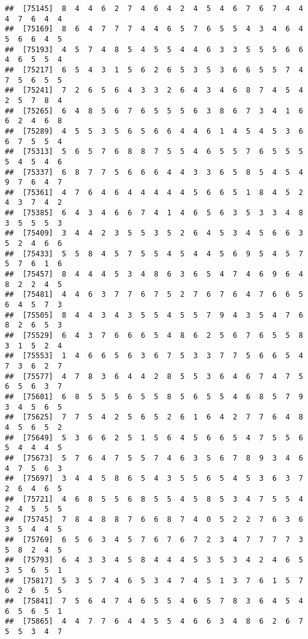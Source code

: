 \documentclass[
]{book}
\begin{document}
\begin{verbatim}
##  [75145]  8  4  4  6  2  7  4  6  4  2  4  5  4  6  7  6  7  4  4  4  7  6  4  4
##  [75169]  8  6  4  7  7  7  4  4  6  5  7  6  5  5  4  3  4  6  4  5  6  6  4  5
##  [75193]  4  5  7  4  8  5  4  5  5  4  4  6  3  3  5  5  5  6  6  4  6  5  5  4
##  [75217]  6  5  4  3  1  5  6  2  6  5  3  5  3  6  6  5  5  7  4  7  5  6  5  5
##  [75241]  7  2  6  5  6  4  3  3  2  6  4  3  4  6  8  7  4  5  4  2  5  7  8  4
##  [75265]  6  4  8  5  6  7  6  5  5  5  6  3  8  6  7  3  4  1  6  6  2  4  6  8
##  [75289]  4  5  5  3  5  6  5  6  6  4  4  6  1  4  5  4  5  3  6  6  7  5  5  4
##  [75313]  5  6  5  7  6  8  8  7  5  5  4  6  5  5  7  6  5  5  5  5  4  5  4  6
##  [75337]  6  8  7  7  5  6  6  6  4  4  3  3  6  5  8  5  4  5  4  9  7  6  4  7
##  [75361]  4  7  6  4  6  4  4  4  4  4  5  6  6  5  1  8  4  5  2  4  3  7  4  2
##  [75385]  6  4  3  4  6  6  7  4  1  4  6  5  6  3  5  3  3  4  8  3  5  5  5  3
##  [75409]  3  4  4  2  3  5  5  3  5  2  6  4  5  3  4  5  6  6  3  5  2  4  6  6
##  [75433]  5  5  8  4  5  7  5  5  4  5  4  4  5  6  9  5  4  5  7  5  7  6  1  6
##  [75457]  8  4  4  4  5  3  4  8  6  3  6  5  4  7  4  6  9  6  4  8  2  2  4  5
##  [75481]  4  4  6  3  7  7  6  7  5  2  7  6  7  6  4  7  6  6  5  6  4  5  7  3
##  [75505]  8  4  4  3  4  3  5  5  4  5  5  7  9  4  3  5  4  7  6  8  2  6  5  3
##  [75529]  6  4  3  7  6  6  6  5  4  8  6  2  5  6  7  6  5  5  8  3  1  5  2  4
##  [75553]  1  4  6  6  5  6  3  6  7  5  3  3  7  7  5  6  6  5  4  7  3  6  2  7
##  [75577]  4  7  8  3  6  4  4  2  8  5  5  3  6  4  6  7  4  7  5  6  5  6  3  7
##  [75601]  6  8  5  5  5  6  5  5  8  5  6  5  5  4  6  8  5  7  9  3  4  5  6  5
##  [75625]  7  7  5  4  2  5  6  5  2  6  1  6  4  2  7  7  6  4  8  4  5  6  5  2
##  [75649]  5  3  6  6  2  5  1  5  6  4  5  6  6  5  4  7  5  5  6  5  4  4  4  5
##  [75673]  5  7  6  4  7  5  5  7  4  6  3  5  6  7  8  9  3  4  6  4  7  5  6  3
##  [75697]  3  4  4  5  8  6  5  4  3  5  5  6  5  4  5  3  6  3  7  2  6  4  6  5
##  [75721]  4  6  8  5  5  6  8  5  5  4  5  8  5  3  4  7  5  5  4  2  4  5  5  5
##  [75745]  7  8  4  8  8  7  6  6  8  7  4  0  5  2  2  7  6  3  6  3  5  4  4  5
##  [75769]  6  5  6  3  4  5  7  6  7  6  7  2  3  4  7  7  7  7  3  5  8  2  4  5
##  [75793]  6  4  3  3  4  5  8  4  4  4  5  3  5  3  4  2  4  6  5  3  5  6  5  1
##  [75817]  5  3  5  7  4  6  5  3  4  7  4  5  1  3  7  6  1  5  7  6  2  6  5  5
##  [75841]  7  5  6  4  7  4  6  5  5  4  6  5  7  8  3  6  4  5  4  6  5  6  5  1
##  [75865]  4  4  7  7  6  4  4  5  5  4  6  6  3  4  8  6  2  6  7  5  5  3  4  7

\end{verbatim}
\end{document}

